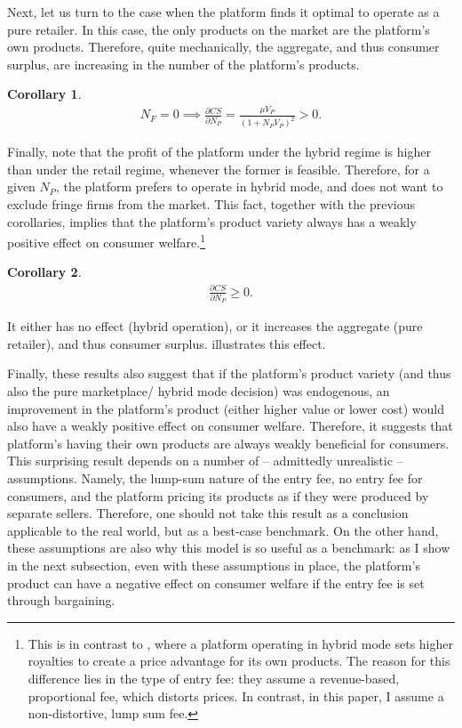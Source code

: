 \documentclass[a4paper]{article}
\newtheorem{corollary}{Corollary}
\begin{document}
Next, let us turn to the case when the platform finds it optimal to operate as a pure retailer.
In this case, the only products on the market are the platform's own products.
Therefore, quite mechanically, the aggregate, and thus consumer surplus, are increasing in the number of the platform's products.
\begin{corollary}
    \begin{align*}
        N_F = 0 \implies \frac{\partial CS}{\partial N_P} = \frac{\mu V_P}{(1 + N_P V_P)^2} > 0.
    \end{align*}
\end{corollary}

Finally, note that the profit of the platform under the hybrid regime is higher than under the retail regime, whenever the former is feasible.
Therefore, for a given $N_P$, the platform prefers to operate in hybrid mode, and does not want to exclude fringe firms from the market.
This fact, together with the previous corollaries, implies that the platform's product variety always has a weakly positive effect on consumer welfare.\footnote{
    This is in contrast to \textcite{anderson2021hybrid}, where a platform operating in hybrid mode sets higher royalties to create a price advantage for its own products.
    The reason for this difference lies in the type of entry fee: they assume a revenue-based, proportional fee, which distorts prices.
    In contrast, in this paper, I assume a non-distortive, lump sum fee.
}
\begin{corollary}
    \begin{align*}
        \frac{\partial CS}{\partial N_P} \geq 0.
    \end{align*}
\end{corollary}
It either has no effect (hybrid operation), or it increases the aggregate (pure retailer), and thus consumer surplus.
 illustrates this effect.

Finally, these results also suggest that if the platform's product variety (and thus also the pure marketplace/ hybrid mode decision) was endogenous, an improvement in the platform's product (either higher value or lower cost) would also have a weakly positive effect on consumer welfare.
Therefore, it suggests that platform's having their own products are always weakly beneficial for consumers.
This surprising result depends on a number of -- admittedly unrealistic -- assumptions.
Namely, the lump-sum nature of the entry fee, no entry fee for consumers, and the platform pricing its products as if they were produced by separate sellers.
Therefore, one should not take this result as a conclusion applicable to the real world, but as a best-case benchmark.
On the other hand, these assumptions are also why this model is so useful as a benchmark: as I show in the next subsection, even with these assumptions in place, the platform's product can have a negative effect on consumer welfare if the entry fee is set through bargaining.
\end{document}

